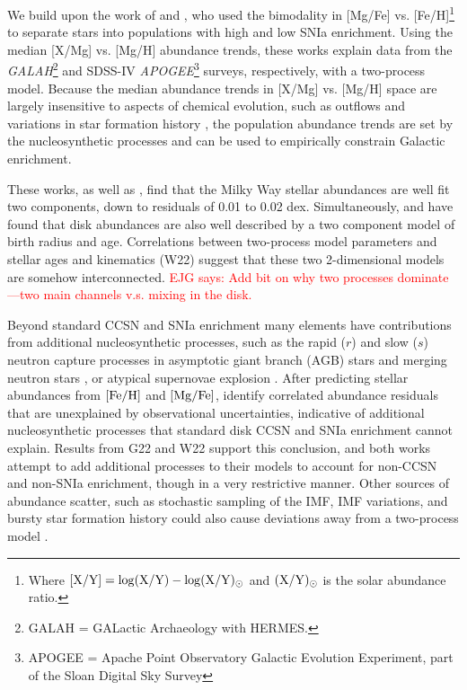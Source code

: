 \documentclass[modern]{aastex631}
\newcommand{\mgfe}[0]{[{\rm Mg/Fe}]}
\newcommand{\feh}[0]{[{\rm Fe/H}]}
\newcommand{\ejg}[1]{\textcolor{red}{EJG says: #1}}
\begin{document}
We build upon the work of \citet[][hereafter G22]{griffith2019, griffith2022} and \citet[][hereafter W19, W22]{weinberg2019, weinberg2022}, who used the bimodality in [Mg/Fe] vs. [Fe/H]\footnote{Where $[{\rm X}/{\rm Y}] = \log({\rm X}/{\rm Y}) - \log({\rm X}/{\rm Y})_{\odot}$ and $({\rm X}/{\rm Y})_{\odot}$ is the solar abundance ratio.} \citep[e.g.,][]{fuhrmann1998, bensby2003, adibekyan2012} to separate stars into populations with high and low SNIa enrichment. Using the median [X/Mg] vs. [Mg/H] abundance trends, these works explain data from the \textsl{GALAH}\footnote{GALAH = GALactic Archaeology with HERMES.} and SDSS-IV \textsl{APOGEE}\footnote{APOGEE = Apache Point Observatory Galactic Evolution Experiment, part of the Sloan Digital Sky Survey} surveys, respectively, with a two-process model. Because the median abundance trends in [X/Mg] vs. [Mg/H] space are largely insensitive to aspects of chemical evolution, such as outflows and variations in star formation history \citep{weinberg2019}, the population abundance trends are set by the nucleosynthetic processes and can be used to empirically constrain Galactic enrichment. 

These works, as well as \citet{ting2022}, find that the Milky Way stellar abundances are well fit two components, down to residuals of 0.01 to 0.02 dex. Simultaneously, \citet{frankel2018} and \citet{ness2022} have found that disk abundances are also well described by a two component model of birth radius and age. Correlations between two-process model parameters and stellar ages and kinematics (W22) suggest that these two 2-dimensional models are somehow interconnected. \ejg{Add bit on why two processes dominate---two main channels v.s. mixing in the disk.}

Beyond standard CCSN and SNIa enrichment many elements have contributions from additional nucleosynthetic processes, such as the rapid ($r$) and slow ($s$) neutron capture processes \citep[e.g.,][]{arlandini1999, bisterzo2014} in asymptotic giant branch (AGB) stars \citep[e.g.,][]{simmerer2004, karakas2016} and merging neutron stars \citep[e.g.,][]{kilpatrick2017}, or atypical supernovae explosion \citep[e.g.,][]{nomoto2013}. After predicting stellar abundances from $\feh$ and $\mgfe$, \citet{ting2022} identify correlated abundance residuals that are unexplained by observational uncertainties, indicative of additional nucleosynthetic processes that standard disk CCSN and SNIa enrichment cannot explain. Results from G22 and W22 support this conclusion, and both works attempt to add additional processes to their models to account for non-CCSN and non-SNIa enrichment, though in a very restrictive manner. Other sources of abundance scatter, such as stochastic sampling of the IMF, IMF variations, and bursty star formation history could also cause deviations away from a two-process model \citep{belokurov2018, griffith2023}.
\end{document}
